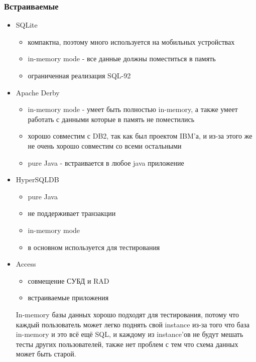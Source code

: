 \subsubsection{Встраиваемые}
\begin{itemize}
	\item SQLite
	      \begin{itemize}
		      \item компактна, поэтому много используется на мобильных устройствах
		      \item in-memory mode - все данные должны поместиться в память
		      \item ограниченная реализация SQL-92
	      \end{itemize}
	\item Apache Derby
	      \begin{itemize}
		      \item in-memory mode - умеет быть полностью in-memory, а также умеет работать с данными которые в память не поместились
		      \item хорошо совместим с DB2, так как был проектом IBM'а, и из-за этого же не очень хорошо совместим со всеми остальными
		      \item pure Java - встраивается в любое java приложение
	      \end{itemize}
	\item HyperSQLDB
	      \begin{itemize}
		      \item pure Java
		      \item не поддерживает транзакции
		      \item in-memory mode
		      \item в основном используется для тестирования
	      \end{itemize}
	\item Access
	      \begin{itemize}
		      \item совмещение СУБД и RAD
		      \item встраиваемые приложения
	      \end{itemize}
	      \begin{remark}
		      In-memory базы данных хорошо подходят для тестирования, потому что каждый пользователь может легко поднять свой instance из-за того что база in-memory и это всё ещё SQL, и каждому из instance'ов не будут мешать тесты других пользователей, также нет проблем с тем что схема данных может быть старой.
	      \end{remark}
\end{itemize}